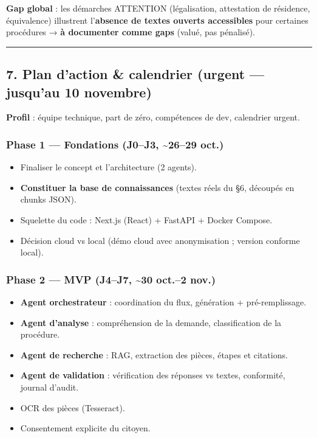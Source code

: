 \documentclass[
]{article}
\providecommand{\tightlist}{%
  \setlength{\itemsep}{0pt}\setlength{\parskip}{0pt}}
\begin{document}
\textbf{Gap global} : les démarches ATTENTION (légalisation, attestation
de résidence, équivalence) illustrent l'\textbf{absence de textes
ouverts accessibles} pour certaines procédures → \textbf{à documenter
comme gaps} (valué, pas pénalisé).

\begin{center}\rule{0.5\linewidth}{0.5pt}\end{center}

\subsection{7. Plan d'action \& calendrier (urgent --- jusqu'au 10
novembre)}\label{plan-daction-calendrier-urgent-jusquau-10-novembre}

\textbf{Profil} : équipe technique, part de zéro, compétences de dev,
calendrier urgent.

\subsubsection{Phase 1 --- Fondations (J0--J3, \textasciitilde26--29
oct.)}\label{phase-1-fondations-j0j3-2629-oct.}

\begin{itemize}
\tightlist
\item[$\square$]
  Finaliser le concept et l'architecture (2 agents).
\item[$\square$]
  \textbf{Constituer la base de connaissances} (textes réels du §6,
  découpés en chunks JSON).
\item[$\square$]
  Squelette du code : Next.js (React) + FastAPI + Docker Compose.
\item[$\square$]
  Décision cloud vs local (démo cloud avec anonymisation ; version
  conforme local).
\end{itemize}

\subsubsection{Phase 2 --- MVP (J4--J7, \textasciitilde30 oct.--2
nov.)}\label{phase-2-mvp-j4j7-30-oct.2-nov.}

\begin{itemize}
\tightlist
\item[$\square$]
  \textbf{Agent orchestrateur} : coordination du flux, génération +
  pré-remplissage.
\item[$\square$]
  \textbf{Agent d'analyse} : compréhension de la demande, classification
  de la procédure.
\item[$\square$]
  \textbf{Agent de recherche} : RAG, extraction des pièces, étapes et
  citations.
\item[$\square$]
  \textbf{Agent de validation} : vérification des réponses vs textes,
  conformité, journal d'audit.
\item[$\square$]
  OCR des pièces (Tesseract).
\item[$\square$]
  Consentement explicite du citoyen.
\end{itemize}
\end{document}

